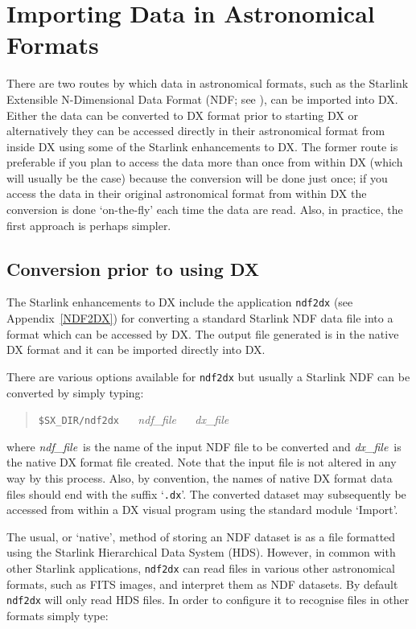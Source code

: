 \section{Importing Data in Astronomical Formats
\label{IMPORTING}  }

There are two routes by which data in astronomical formats, such
as the Starlink Extensible N-Dimensional Data Format (NDF; see
\cite{SUN33}), can be imported into DX. Either the
data can be converted to DX format prior to starting DX or alternatively
they can be accessed directly in their astronomical format from inside DX
using some of the Starlink enhancements to DX. The former route is
preferable if you plan to access the data more than once from within DX
(which will usually be the case) because the conversion will be done just
once; if you access the data in their original astronomical format from
within DX the conversion is done `on-the-fly' each time the data are read.
Also, in practice, the first approach is perhaps simpler.

\subsection{Conversion prior to using DX \label{PRIOR} }

The Starlink enhancements to DX include the application {\tt ndf2dx} (see
Appendix~\ref{NDF2DX}) for converting a standard Starlink NDF data file
into a format which can be accessed by DX. The output file generated is
in the native DX format and it can be imported directly into DX.

There are various options available for {\tt ndf2dx}
but usually a Starlink NDF can be
converted by simply typing:

\begin{quote}
{\tt \$SX\_DIR/ndf2dx} ~~ {\it ndf\_file} ~~ {\it dx\_file}
\end{quote}

where {\it ndf\_file}\, is the name of the input NDF file to be
converted and  {\it dx\_file}\, is the native DX format file created.
Note that the input file is not altered in any way by this process.
Also, by convention, the names of native DX format data files should end
with the suffix `{\tt .dx}'. The converted dataset may subsequently be
accessed from within a DX visual program using the standard module
`Import'.

The usual, or `native', method of storing an NDF dataset is as a file
formatted using the Starlink Hierarchical Data System (HDS). However,
in common with other Starlink applications, {\tt ndf2dx} can read
files in various other astronomical formats, such as FITS images, and
interpret them as NDF datasets. By default {\tt ndf2dx} will only
read HDS files. In order to configure it to recognise files in other
formats simply type:

